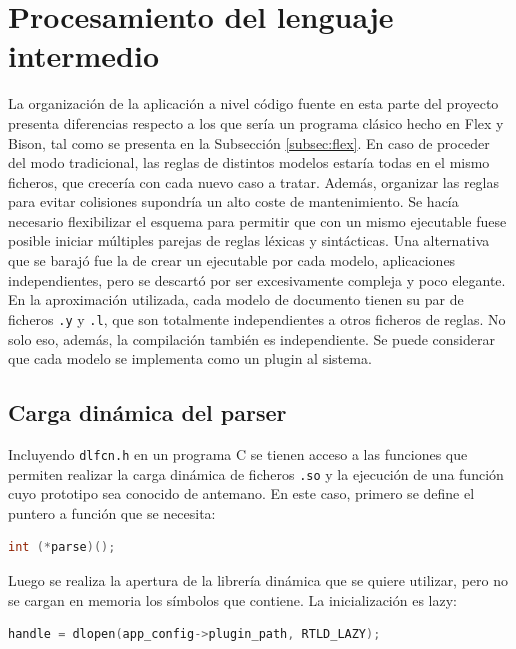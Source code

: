 \section{Procesamiento del lenguaje intermedio}

La organización de la aplicación a nivel código fuente en esta parte del proyecto presenta diferencias respecto a los que sería un programa clásico hecho en Flex y Bison, tal como se presenta en la Subsección \ref{subsec:flex}. En caso de proceder del modo tradicional, las reglas de distintos modelos estaría todas en el mismo ficheros, que crecería con cada nuevo caso a tratar. Además, organizar las reglas para evitar colisiones supondría un alto coste de mantenimiento. Se hacía necesario flexibilizar el esquema  para permitir que con un mismo ejecutable fuese posible iniciar múltiples parejas de reglas léxicas y sintácticas. Una alternativa que se barajó fue la de crear un ejecutable por cada modelo, aplicaciones independientes, pero se descartó por ser excesivamente compleja y poco elegante. En la aproximación utilizada, cada modelo de documento tienen su par de ficheros \verb|.y| y \verb|.l|, que son totalmente independientes a otros ficheros de reglas. No solo eso, además, la compilación también es independiente. Se puede considerar que cada modelo se implementa como un plugin al sistema.


\subsection{Carga dinámica del parser}

Incluyendo \verb|dlfcn.h| en un programa C se tienen acceso a las funciones que permiten realizar la carga dinámica de ficheros \verb|.so| y la ejecución de una función cuyo prototipo sea conocido de antemano. En este caso, primero se define el puntero a función que se necesita:

\begin{lstlisting}[language=C,caption={},label={}]
int (*parse)();
\end{lstlisting}

Luego se realiza la apertura de la librería dinámica que se quiere utilizar, pero no se cargan en memoria los símbolos que contiene. La inicialización es lazy:

\begin{lstlisting}[language=C,caption={},label={}]
handle = dlopen(app_config->plugin_path, RTLD_LAZY);
\end{lstlisting}

